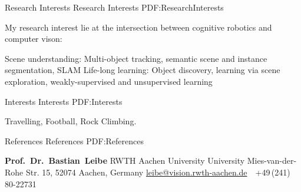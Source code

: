 \documentclass[letterpaper,MMMyyyy,nonstopmode]{simpleresumecv}
\newcommand{\CVNote}{CV compiled on {\today}}
\begin{document}
\begin{Body}

\Section
{Research Interests}
{Research Interests}
{PDF:ResearchInterests}

My research interest lie at the intersection between cognitive robotics and computer vison:
\begin{Detail}
\BulletItem
Scene understanding: Multi-object tracking, semantic scene and instance segmentation, SLAM
\BulletItem
Life-long learning: Object discovery, learning via scene exploration, weakly-supervised and unsupervised learning
\end{Detail}



\Section
{Interests}
{Interests}
{PDF:Interests}

\Entry
Travelling,
Football,
Rock Climbing.


\Section
{References}
{References}
{PDF:References}

\BulletItem
\textbf{Prof.~Dr.~Bastian~Leibe}
\newline
RWTH Aachen University University
\newline
Mies-van-der-Rohe Str. 15, 52074 Aachen, Germany
\newline
\href{mailto:leibe@vision.rwth-aachen.de}
{leibe@vision.rwth-aachen.de}
\,\SubBulletSymbol\,
+49\,(241)\,80-22731

\end{Body}


\end{document}
